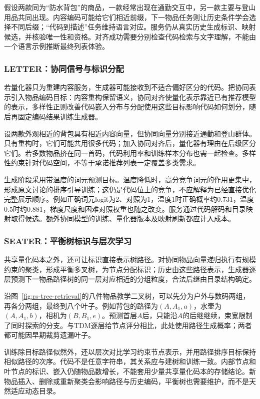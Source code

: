 假设两款同为“防水背包”的商品，一款经常出现在通勤交互中，另一款主要与登山用品共同出现。内容编码可能给它们相近前缀，下一物品任务则让历史条件学会选择不同后缀；“代码到描述”任务维持语言对应。服务仍从真实历史生成标识、映射候选，并核验唯一性和资格。对齐成功需要分别检查代码检索与文字理解，不能由一个语言示例推断最终列表体验。

\subsubsection{LETTER：协同信号与标识分配}
\label{sec:rs-letter}

若量化器只为重建内容服务，生成器可能接收到不适合偏好区分的代码。把协同表示引入物品编码目标：内容重构保留语义，协同对齐使量化表示靠近已有推荐模型的表示，多样性正则改善代码嵌入分布与分配使用这些目标影响代码如何划分，随后再固定编码结果训练生成器。

设两款外观相近的背包具有相近内容向量，但协同向量分别接近通勤和登山群体。只有重构时，它们可能共用很多代码；加入协同对齐后，量化器有理由在后级区分它们。若多数物品挤在同一首码，代码利用率和训练样本分布也需一起检查。多样性约束针对代码空间，不等于承诺推荐列表一定覆盖多类需求。

生成阶段采用带温度的词元预测目标。温度降低时，高分竞争词元的作用更集中，形成原文讨论的排序引导训练；这仍是代码位上的竞争，不应解释为已经直接优化完整展示顺序。例如正确词元logit为2、对照为1，温度1时正确概率约0.731，温度0.5时约0.881，梯度尺度和困难对照权重也随之改变。服务通过代码解码和目录映射取得候选。额外协同模型的训练、量化器版本及映射刷新都应计入成本。

\subsubsection{SEATER：平衡树标识与层次学习}
\label{sec:rs-seater}

共享量化码本之外，还可让标识直接表示树路径。对协同物品向量递归执行有规模约束的聚类，形成平衡多叉树，为节点分配标识；历史由这些路径表示，生成器逐层预测下一物品路径树的同一层对应相近的分组粒度，合法后继由目录结构确定。

沿图~\ref{fig:rs-tree-retrieval}的八件物品教学二叉树，可以先分为户外与数码两组，再各分两组，最终到八个叶子。例如背包的路径为$(A,A_1,a)$，水壶为$(A,A_1,b)$，相机为$(B,B_1,e)$。预测首层$A$后，只能沿$A$的后继继续，束宽限制了同时探索的分支。与TDM逐层给节点评分相比，此处使用路径生成概率；两者都可能因早期裁剪遗漏叶子。

训练除目标路径似然外，还以层次对比学习约束节点表示，并用路径排序目标保持相似路径的次序。代码不是任意字符串，其关系应与建树和训练一致。内部节点和叶节点的标识、嵌入仍随物品数增长，不能套用少量共享量化码本的存储结论。新物品插入、删除或重新聚类会影响路径与历史编码，平衡树也需要维护，而不是天然适应动态目录。

